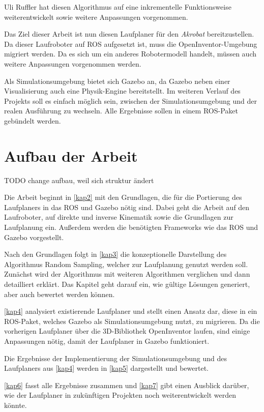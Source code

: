 Uli Ruffler \autocite{ruffler2006} hat diesen Algorithmus auf eine inkrementelle Funktionsweise weiterentwickelt sowie weitere Anpassungen vorgenommen.

Das Ziel dieser Arbeit ist nun diesen Laufplaner für den \emph{Akrobat} bereitzustellen. Da dieser Laufroboter auf \ac{ROS} aufgesetzt ist, muss die OpenInventor-Umgebung migriert werden. Da es sich um ein anderes Robotermodell handelt, müssen auch weitere Anpassungen vorgenommen werden.

Als Simulationsumgebung bietet sich Gazebo an, da Gazebo neben einer Visualisierung auch eine Physik-Engine bereitstellt. Im weiteren Verlauf des Projekts soll es einfach möglich sein, zwischen der Simulationsumgebung und der realen Ausführung zu wechseln. Alle Ergebnisse sollen in einem \ac{ROS}-Paket gebündelt werden.

\section{Aufbau der Arbeit}

TODO change aufbau, weil sich struktur ändert

Die Arbeit beginnt in \autoref{kap2} mit den Grundlagen, die für die Portierung des Laufplaners in das \ac{ROS} und Gazebo nötig sind. Dabei geht die Arbeit auf den Laufroboter, auf direkte und inverse Kinematik sowie die Grundlagen zur Laufplanung ein. Außerdem werden die benötigten Frameworks wie das \ac{ROS} und Gazebo vorgestellt.

Nach den Grundlagen folgt in \autoref{kap3} die konzeptionelle Darstellung des Algorithmus Random Sampling, welcher zur Laufplanung genutzt werden soll. Zunächst wird der Algorithmus mit weiteren Algorithmen verglichen und dann detailliert erklärt. Das Kapitel geht darauf ein, wie gültige Lösungen generiert, aber auch bewertet werden können.

\autoref{kap4} analysiert existierende Laufplaner und stellt einen Ansatz dar, diese in ein \ac{ROS}-Paket, welches Gazebo als Simulationsumgebung nutzt, zu migrieren. Da die vorherigen Laufplaner über die 3D-Bibliothek OpenInventor laufen, sind einige Anpassungen nötig, damit der Laufplaner in Gazebo funktioniert.

Die Ergebnisse der Implementierung der Simulationsumgebung und des Laufplaners aus \autoref{kap4} werden in \autoref{kap5} dargestellt und bewertet.

\autoref{kap6} fasst alle Ergebnisse zusammen und \autoref{kap7} gibt einen Ausblick darüber, wie der Laufplaner in zukünftigen Projekten noch weiterentwickelt werden könnte.